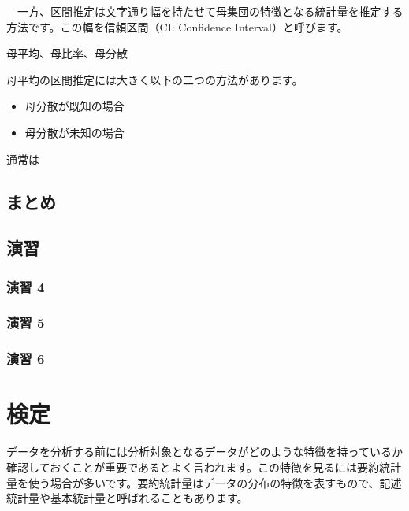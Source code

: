 \documentclass[
  12pt,
]{book}
\providecommand{\tightlist}{%
  \setlength{\itemsep}{0pt}\setlength{\parskip}{0pt}}
\begin{document}
　一方、区間推定は文字通り幅を持たせて母集団の特徴となる統計量を推定する方法です。この幅を信頼区間（CI: Confidence Interval）と呼びます。

母平均、母比率、母分散

母平均の区間推定には大きく以下の二つの方法があります。

\begin{itemize}
\tightlist
\item
  母分散が既知の場合
\item
  母分散が未知の場合
\end{itemize}

通常は

\hypertarget{ux307eux3068ux3081-2}{%
\subsection{まとめ}\label{ux307eux3068ux3081-2}}

\hypertarget{ux6f14ux7fd2-4}{%
\subsection{演習}\label{ux6f14ux7fd2-4}}

\hypertarget{ux6f14ux7fd2-4-1}{%
\subsubsection*{演習 4}\label{ux6f14ux7fd2-4-1}}

\hypertarget{ux6f14ux7fd2-5}{%
\subsubsection*{演習 5}\label{ux6f14ux7fd2-5}}

\hypertarget{ux6f14ux7fd2-6}{%
\subsubsection*{演習 6}\label{ux6f14ux7fd2-6}}

\hypertarget{ux691cux5b9a}{%
\section{検定}\label{ux691cux5b9a}}

データを分析する前には分析対象となるデータがどのような特徴を持っているか確認しておくことが重要であるとよく言われます。この特徴を見るには要約統計量を使う場合が多いです。要約統計量はデータの分布の特徴を表すもので、記述統計量や基本統計量と呼ばれることもあります。
\end{document}
